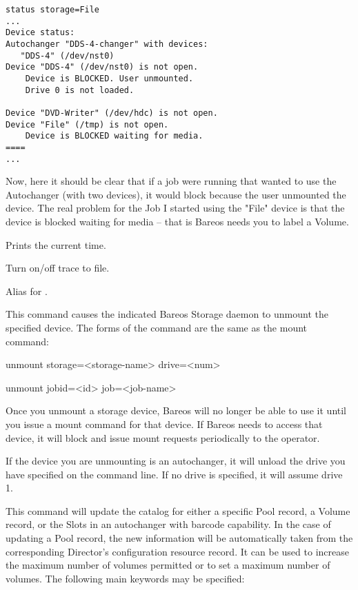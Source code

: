 \begin{description}
{\footnotesize
\begin{verbatim}
status storage=File
...
Device status:
Autochanger "DDS-4-changer" with devices:
   "DDS-4" (/dev/nst0)
Device "DDS-4" (/dev/nst0) is not open.
    Device is BLOCKED. User unmounted.
    Drive 0 is not loaded.

Device "DVD-Writer" (/dev/hdc) is not open.
Device "File" (/tmp) is not open.
    Device is BLOCKED waiting for media.
====
...
\end{verbatim}
\normalsize

Now, here it should be clear that if a job were running that wanted
to use the Autochanger (with two devices), it would block because
the user unmounted the device. The real problem for the Job I started
using the "File" device is that the device is blocked waiting for
media -- that is Bareos needs you to label a Volume.

\item [time]
   Prints the current time.

\item [trace]
   Turn on/off trace to file.

\item [umount]
   Alias for .

\item [unmount]
   This command causes the indicated Bareos Storage  daemon to unmount the
   specified device. The forms of the command  are the same as the mount command:

unmount storage={\textless}storage-name{\textgreater} {\textlbrack}drive={\textless}num{\textgreater}{\textrbrack}

unmount {\textlbrack}jobid={\textless}id{\textgreater} {\textbar} job={\textless}job-name{\textgreater}{\textrbrack}

   Once you unmount a storage device, Bareos will no longer be able to use
   it until you issue a mount command for that device. If Bareos needs to
   access that device, it will block and issue mount requests periodically
   to the operator.

   If the device you are unmounting is an autochanger, it will unload
   the drive you have specified on the command line. If no drive is
   specified, it will assume drive 1.

\item [update]
   \label{UpdateCommand}
   This command will update the catalog for either a specific Pool record, a Volume
   record, or the Slots in an  autochanger with barcode capability. In the case
   of updating a  Pool record, the new information will be automatically taken
   from  the corresponding Director's configuration resource record. It  can be
   used to increase the maximum number of volumes permitted or  to set a maximum
   number of volumes. The following main  keywords may be specified:

}
\end{description}
